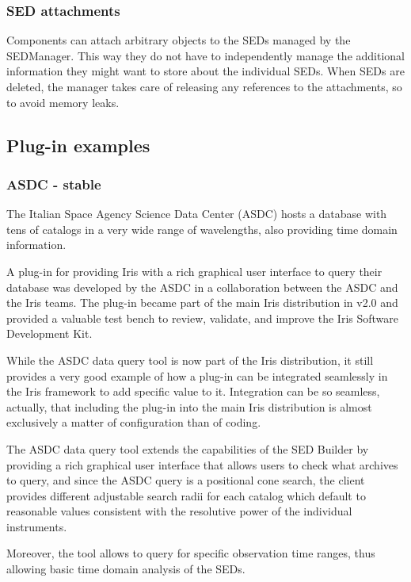 \documentclass[5p]{elsarticle}
\begin{document}
\subsubsection{SED attachments}
Components can attach arbitrary objects to the SEDs managed by the SEDManager. This way they do not have to independently manage the additional information they might want to store about the individual SEDs. When SEDs are deleted, the manager takes care of releasing any references to the attachments, so to avoid memory leaks.



\subsection{Plug-in examples}
\subsubsection{ASDC - stable}
The Italian Space Agency Science Data Center (ASDC) hosts a database with tens of catalogs in a very wide range of wavelengths, also providing time domain information.

A plug-in for providing Iris with a rich graphical user interface to query their database was developed by the ASDC in a collaboration between the ASDC and the Iris teams. The plug-in became part of the main Iris distribution in v2.0 and provided a valuable test bench to review, validate, and improve the Iris Software Development Kit.

While the ASDC data query tool is now part of the Iris distribution, it still provides a very good example of how a plug-in can be integrated seamlessly in the Iris framework to add specific value to it. Integration can be so seamless, actually, that including the plug-in into the main Iris distribution is almost exclusively a matter of configuration than of coding.

The ASDC data query tool extends the capabilities of the SED Builder by providing a rich graphical user interface that allows users to check what archives to query, and since the ASDC query is a positional cone search, the client provides different adjustable search radii for each catalog which default to reasonable values consistent with the resolutive power of the individual instruments.

Moreover, the tool allows to query for specific observation time ranges, thus allowing basic time domain analysis of the SEDs.
\end{document}
